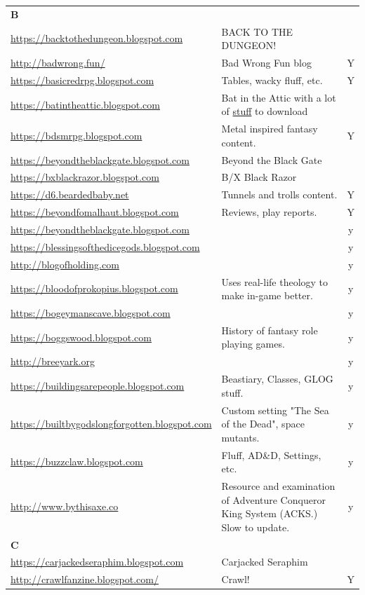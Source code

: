 \documentclass[a4paper, 11pt, twoside]{article}
\begin{document}
\begin{longtable}{p{6cm}p{8cm}c}
\textbf{B} &  & \\
\url{https://backtothedungeon.blogspot.com} & BACK TO THE DUNGEON! & \\
\url{http://badwrong.fun/} & Bad Wrong Fun blog & Y\\
\url{https://basicredrpg.blogspot.com} & Tables, wacky fluff, etc. & Y\\
\url{https://batintheattic.blogspot.com} & Bat in the Attic with a lot of \href{https://batintheattic.blogspot.com/p/stuff-in-attic.html}{stuff} to download & \\
\url{https://bdsmrpg.blogspot.com} & Metal inspired fantasy content. & Y\\
\url{https://beyondtheblackgate.blogspot.com} & Beyond the Black Gate & \\
\url{https://bxblackrazor.blogspot.com} & B/X Black Razor & \\
\url{https://d6.beardedbaby.net} & Tunnels and trolls content. & Y\\
\url{https://beyondfomalhaut.blogspot.com} & Reviews, play reports. & Y\\
\url{https://beyondtheblackgate.blogspot.com} &  & y\\
\url{https://blessingsofthedicegods.blogspot.com} &  & y\\
\url{http://blogofholding.com} &  & y\\
\url{https://bloodofprokopius.blogspot.com} & Uses real-life theology to make in-game better. & y\\
\url{https://bogeymanscave.blogspot.com} &  & y\\
\url{https://boggswood.blogspot.com} & History of fantasy role playing games. & y\\
\url{http://breeyark.org} &  & y\\
\url{https://buildingsarepeople.blogspot.com} & Beastiary, Classes, GLOG stuff. & y\\
\url{https://builtbygodslongforgotten.blogspot.com} & Custom setting "The Sea of the Dead", space mutants. & y\\
\url{https://buzzclaw.blogspot.com} & Fluff, AD\&D, Settings, etc. & y\\
\url{http://www.bythisaxe.co} & Resource and examination of Adventure Conqueror King System (ACKS.) Slow to update. & y\\
\textbf{C} &  & \\
\url{https://carjackedseraphim.blogspot.com} & Carjacked Seraphim & \\
\url{http://crawlfanzine.blogspot.com/} & Crawl! & Y\\

\end{longtable}
\end{document}
